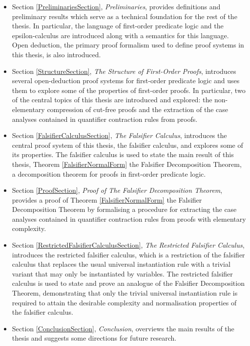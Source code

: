 \documentclass[10pt]{article}
\theoremstyle{definition}\newtheorem{remark}[theorem]{Remark}
\theoremstyle{definition}\newtheorem{example}[theorem]{Example}
\theoremstyle{definition}\newtheorem{definition}[theorem]{Definition}
\begin{document}
	\begin{itemize}
		\item Section \ref{PreliminariesSection}, \textit{Preliminaries}, provides definitions and preliminary results which serve as a technical foundation for the rest of the thesis. In particular, the language of first-order predicate logic and the epsilon-calculus are introduced along with a semantics for this language. Open deduction, the primary proof formalism used to define proof systems in this thesis, is also introduced.
		
		\item Section \ref{StructureSection}, \textit{The Structure of First-Order Proofs}, introduces several open-deduction proof systems for first-order predicate logic and uses them to explore some of the properties of first-order proofs. In particular, two of the central topics of this thesis are introduced and explored: the non-elementary compression of cut-free proofs and the extraction of the case analyses contained in quantifier contraction rules from proofs.
		
		\item Section \ref{FalsifierCalculusSection}, \textit{The Falsifier Calculus}, introduces the central proof system of this thesis, the falsifier calculus, and explores some of its properties. The falsifier calculus is used to state the main result of this thesis, Theorem \ref{FalsifierNormalForm} the Falsifier Decomposition Theorem, a decomposition theorem for proofs in first-order predicate logic.
		
		\item Section \ref{ProofSection}, \textit{Proof of The Falsifier Decomposition Theorem}, provides a proof of Theorem \ref{FalsifierNormalForm} the Falsifier Decomposition Theorem by formalising a procedure for extracting the case analyses contained in quantifier contraction rules from proofs with elementary complexity.
		
		\item Section \ref{RestrictedFalsifierCalculusSection}, \textit{The Restricted Falsifier Calculus}, introduces the restricted falsifier calculus, which is a restriction of the falsifier calculus that replaces the usual universal instantiation rule with a trivial variant that may only be instantiated by variables. The restricted falsifier calculus is used to state and prove an analogue of the Falsifier Decomposition Theorem, demonstrating that only the trivial universal instantiation rule is required to attain the desirable complexity and normalisation properties of the falsifier calculus.
		
		\item Section \ref{ConclusionSection}, \textit{Conclusion}, overviews the main results of the thesis and suggests some directions for future research.
	\end{itemize}
	
\end{document}
